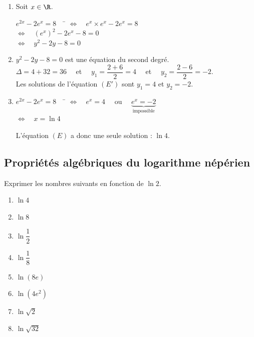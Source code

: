 \documentclass[a4paper,11pt,exos]{nsi} %
\begin{document}
\newpage
\textcolor{UGLiBlue}{
    \begin{enumerate}
        \item Soit $x\in\R$.
        \begin{tabbing}
            $e^{2x}-2e^x=8\quad$ \= $\iff \quad e^x\times e^x-2e^x=8$\\
            \> $\iff \quad \left(e^x\right)^2-2e^x-8=0$\\
            \>$\iff \quad y^2-2y-8=0$
        \end{tabbing}
        \item $y^2-2y-8=0$ est une équation du second degré.\\[.5em]
        $\Delta=4+32=36\quad$ et $\quad y_1=\dfrac{2+6}{2}=4\quad$ et $\quad y_2=\dfrac{2-6}{2}=-2$.\\[.5em]
        Les solutions de l'équation $(E')$ sont $y_1=4$ et $y_2=-2$.
        \item \begin{tabbing}
            $e^{2x}-2e^x=8\quad$ \= $\iff \quad e^x=4\quad$ ou $\quad \underbrace{e^x=-2}_{\text{impossible}}$\\
            \> $\iff \quad x=\ln 4\quad $
        \end{tabbing}
        L'équation $(E)$ a donc une seule solution : $\ln 4$.
    \end{enumerate}
}

\subsection*{Propriétés algébriques du logarithme népérien}
\exo{}
Exprimer les nombres suivants en fonction de $\ln 2$.
\begin{multicols}{4}
    \begin{enumerate}
        \item $\ln 4$
        \item $\ln 8$
        \item $\ln \dfrac{1}{2}$
        \item $\ln \dfrac{1}{8}$
        \item $\ln (8e)$
        \item $\ln \left(4e^2\right)$
        \item $\ln \sqrt{2}$
        \item $\ln \sqrt{32}$
    \end{enumerate}
\end{multicols}
\end{document}
